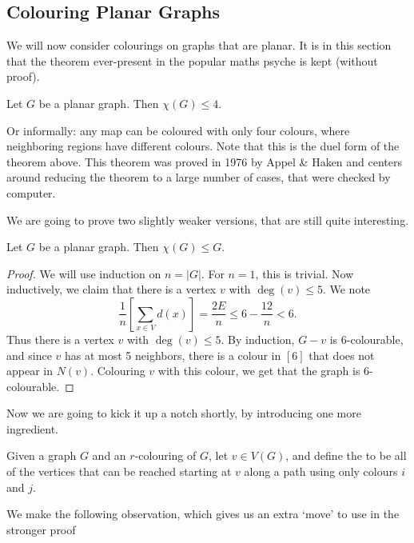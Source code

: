\documentclass[a4paper]{scrartcl}
\begin{document}
\subsection{Colouring Planar Graphs}

We will now consider colourings on graphs that are planar. It is in this section that the theorem ever-present in the popular maths psyche is kept (without proof).

\begin{theorem}
	Let $G$ be a planar graph. Then $\chi(G) \leq 4$.
\end{theorem}

Or informally: any map can be coloured with only four colours, where neighboring regions have different colours. Note that this is the duel form of the theorem above.
This theorem was proved in 1976 by Appel \& Haken and centers around reducing the theorem to a large number of cases, that were checked by computer.

We are going to prove two slightly weaker versions, that are still quite interesting.

\begin{theorem}
Let $G$ be a planar graph. Then $\chi(G) \leq G$.
\end{theorem}
\begin{proof}
	We will use induction on $n = |G|$. For $n = 1$, this is trivial.
	Now inductively, we claim that there is a vertex $v$ with $\deg(v) \leq 5$. We note
	$$
	\frac{1}{n}\left[\sum_{x \in V} d(x)\right] = \frac{2E}{n} \leq 6 - \frac{12}{n} < 6.
	$$
	Thus there is a vertex $v$ with $\deg(v) \leq 5$. By induction, $G - v$ is 6-colourable, and since $v$ has at most 5 neighbors, there is a colour in $[6]$ that does not appear in $N(v)$. Colouring $v$ with this colour, we get that the graph is 6-colourable.
\end{proof}

Now we are going to kick it up a notch shortly, by introducing one more ingredient.

\begin{definition}
	Given a graph $G$ and an $r$-colouring of $G$, let $v \in V(G)$, and define the  to be all of the vertices that can be reached starting at $v$ along a path using only colours $i$ and $j$.
\end{definition}

We make the following observation, which gives us an extra `move' to use in the stronger proof
\end{document}
